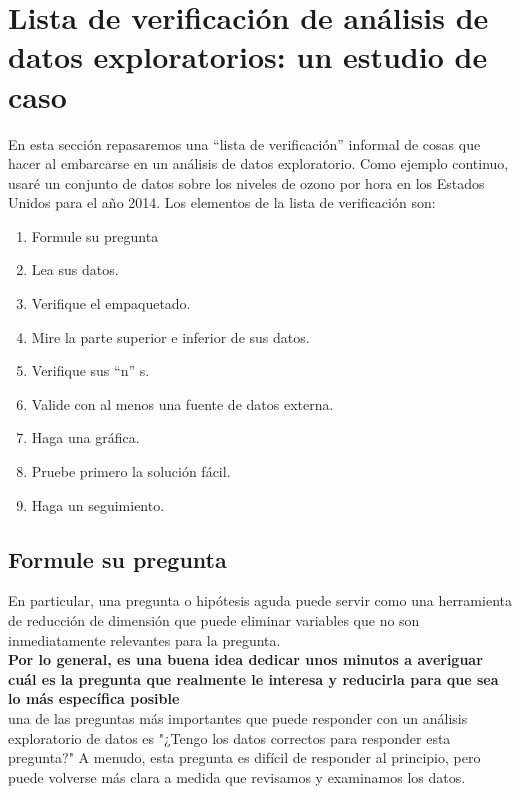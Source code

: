 \documentclass[10pt]{book}
\begin{document}
    \section{Lista de verificación de análisis de datos exploratorios: un estudio de caso}
    En esta sección repasaremos una “lista de verificación” informal de cosas que hacer al embarcarse en un análisis de datos exploratorio. Como ejemplo continuo, usaré un conjunto de datos sobre los niveles de ozono por hora en los Estados Unidos para el año 2014. Los elementos de la lista de verificación son:
    \begin{enumerate}[\bfseries 1.]
        \item Formule su pregunta
        \item Lea sus datos. 
        \item Verifique el empaquetado. 
        \item Mire la parte superior e inferior de sus datos. 
        \item Verifique sus “n” s. 
        \item Valide con al menos una fuente de datos externa. 
        \item Haga una gráfica. 
        \item Pruebe primero la solución fácil.
        \item Haga un seguimiento.
    \end{enumerate}

        \subsection{Formule su pregunta}
        En particular, una pregunta o hipótesis aguda puede servir como una herramienta de reducción de dimensión que puede eliminar variables que no son inmediatamente relevantes para la pregunta. \\
        \textbf{ Por lo general, es una buena idea dedicar unos minutos a averiguar cuál es la pregunta que realmente le interesa y reducirla para que sea lo más específica posible}\\
        una de las preguntas más importantes que puede responder con un análisis exploratorio de datos es "¿Tengo los datos correctos para responder esta pregunta?" A menudo, esta pregunta es difícil de responder al principio, pero puede volverse más clara a medida que revisamos y examinamos los datos.
\end{document}
